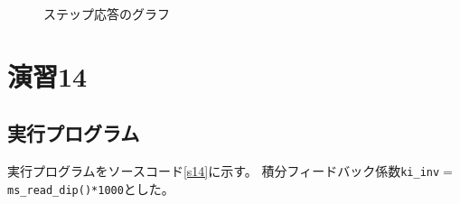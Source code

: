 \begin{figure}[H]
  \begin{center}
  \caption{ステップ応答のグラフ}
  \end{center}
\end{figure}

\section{演習14}
\subsection{実行プログラム}
実行プログラムをソースコード\ref{s14}に示す。
積分フィードバック係数\verb|ki_inv|$=$\verb|ms_read_dip()*1000|とした。

